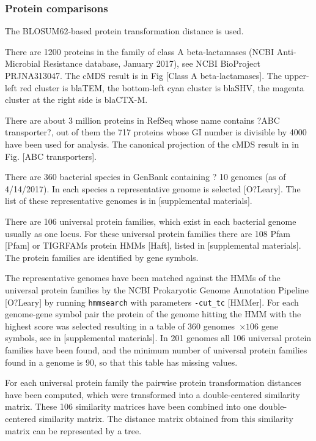 \documentclass[10pt,a4paper]{article}
\begin{document}
\subsubsection{Protein comparisons}

The BLOSUM62-based protein transformation distance is used.



There are 1200 proteins in the family of class A beta-lactamases (NCBI Anti-Microbial Resistance database, January 2017), 
see NCBI BioProject PRJNA313047. 
The cMDS result is in Fig [Class A beta-lactamases]. 
The upper-left red cluster is blaTEM, the bottom-left cyan cluster is blaSHV, the magenta cluster at the right side is blaCTX-M.



There are about 3 million proteins in RefSeq whose name contains ?ABC transporter?, 
out of them the 717 proteins whose GI number is divisible by 4000 have been used for analysis.
The canonical projection of the cMDS result in in Fig. [ABC transporters]. 



There are 360 bacterial species in GenBank containing ? 10 genomes (as of 4/14/2017). 
In each species a representative genome is selected [O?Leary]. 
The list of these representative genomes is in [supplemental materials]. 

There are 106 universal protein families, which exist in each bacterial genome usually as one locus. 
For these universal protein families there are 108 Pfam [Pfam] or TIGRFAMs protein HMMs [Haft], listed in [supplemental materials].
The protein families are identified by gene symbols. 

The representative genomes have been matched against the HMMs of the universal protein families by the NCBI Prokaryotic Genome Annotation Pipeline [O?Leary] by running \verb|hmmsearch| with parameters \verb|-cut_tc| [HMMer]. 
For each genome-gene symbol pair the protein of the genome hitting the HMM with the highest score was selected resulting in a table of 360 genomes~$\times 106$ gene symbols, see in [supplemental materials]. 
In 201 genomes all 106 universal protein families have been found, 
and the minimum number of universal protein families found in a genome is 90, so that this table has missing values.

For each universal protein family the pairwise protein transformation distances have been computed, 
which were transformed into a double-centered similarity matrix. 
These 106 similarity matrices have been combined into one double-centered similarity matrix. 
The distance matrix obtained from this similarity matrix can be represented by a tree.
\end{document}
